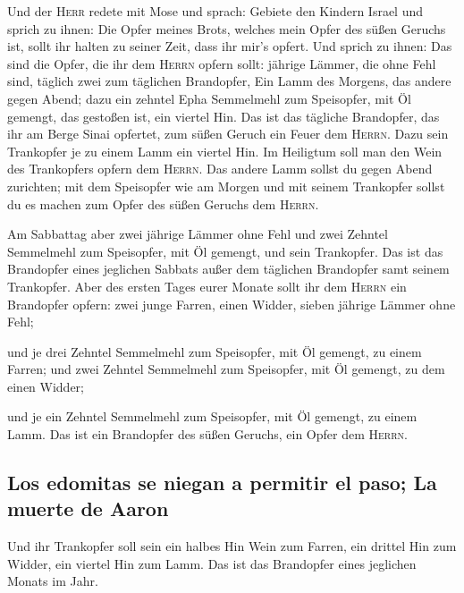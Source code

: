 Und der \textsc{Herr} redete mit Mose und sprach:
 Gebiete den Kindern Israel und sprich zu ihnen: Die Opfer
meines Brots, welches mein Opfer des süßen Geruchs ist, sollt ihr halten
zu seiner Zeit, dass ihr mir's opfert.  Und sprich zu
ihnen: Das sind die Opfer, die ihr dem \textsc{Herrn} opfern sollt:
jährige Lämmer, die ohne Fehl sind, täglich zwei zum täglichen
Brandopfer,  Ein Lamm des Morgens, das andere gegen Abend;
 dazu ein zehntel Epha Semmelmehl zum Speisopfer, mit Öl
gemengt, das gestoßen ist, ein viertel Hin.  Das ist das
tägliche Brandopfer, das ihr am Berge Sinai opfertet, zum süßen Geruch
ein Feuer dem \textsc{Herrn}.  Dazu sein Trankopfer je zu
einem Lamm ein viertel Hin. Im Heiligtum soll man den Wein des
Trankopfers opfern dem \textsc{Herrn}.  Das andere Lamm
sollst du gegen Abend zurichten; mit dem Speisopfer wie am Morgen und
mit seinem Trankopfer sollst du es machen zum Opfer des süßen Geruchs
dem \textsc{Herrn}.

 Am Sabbattag aber zwei jährige Lämmer ohne Fehl und zwei
Zehntel Semmelmehl zum Speisopfer, mit Öl gemengt, und sein Trankopfer.
 Das ist das Brandopfer eines jeglichen Sabbats außer dem
täglichen Brandopfer samt seinem Trankopfer.  Aber des
ersten Tages eurer Monate sollt ihr dem \textsc{Herrn} ein Brandopfer
opfern: zwei junge Farren, einen Widder, sieben jährige Lämmer ohne
Fehl;

 und je drei Zehntel Semmelmehl zum Speisopfer, mit Öl
gemengt, zu einem Farren; und zwei Zehntel Semmelmehl zum Speisopfer,
mit Öl gemengt, zu dem einen Widder;

 und je ein Zehntel Semmelmehl zum Speisopfer, mit Öl
gemengt, zu einem Lamm. Das ist ein Brandopfer des süßen Geruchs, ein
Opfer dem \textsc{Herrn}.

\hypertarget{los-edomitas-se-niegan-a-permitir-el-paso-la-muerte-de-aaron}{%
\subsection{Los edomitas se niegan a permitir el paso; La muerte de
Aaron}\label{los-edomitas-se-niegan-a-permitir-el-paso-la-muerte-de-aaron}}

 Und ihr Trankopfer soll sein ein halbes Hin Wein zum
Farren, ein drittel Hin zum Widder, ein viertel Hin zum Lamm. Das ist
das Brandopfer eines jeglichen Monats im Jahr.

